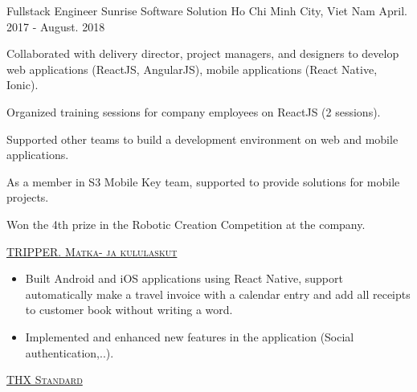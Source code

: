 \begin{cventries}
  \cventry
    {Fullstack Engineer} %
    {Sunrise Software Solution}
    {Ho Chi Minh City, Viet Nam} %
    {April. 2017 - August. 2018} %
    {
      \begin{cvitems} %
        \item {Collaborated with delivery director, project managers, and designers to develop web applications (ReactJS, AngularJS), mobile applications (React Native, Ionic).}
        \item {Organized training sessions for company employees on ReactJS (2 sessions).}
        \item {Supported other teams to build a development environment on web and mobile applications.}
        \item {As a member in S3 Mobile Key team, supported to provide solutions for mobile projects.}
        \item {Won the 4th prize in the Robotic Creation Competition at the company.}
      \end{cvitems}
      \vspace{5mm}
      \vspace{2mm}\hspace{5mm}\faTasks\hspace{1mm}{\fontsize{8pt}{1em}\bodyfont\scshape\color{graytext} {Project}} {\fontsize{9pt}{1em}\bodyfont\scshape\color{awesome} \href{https://gettripper.com}{TRIPPER. Matka- ja kululaskut}}
      \begin{itemize}
        \item {Built Android and iOS applications using React Native, support automatically make a travel invoice with a calendar entry and add all receipts to customer book without writing a word.}
        \item {Implemented and enhanced new features in the application (Social authentication,..).}
      \end{itemize}
      \vspace{2mm}\hspace{5mm}\faTasks\hspace{1mm}{\fontsize{8pt}{1em}\bodyfont\scshape\color{graytext} {Project}} {\fontsize{9pt}{1em}\bodyfont\scshape\color{awesome} \href{https://www.thxstandard.com}{THX Standard}}
      \begin{itemize}

\end{itemize}}
\end{cventries}
